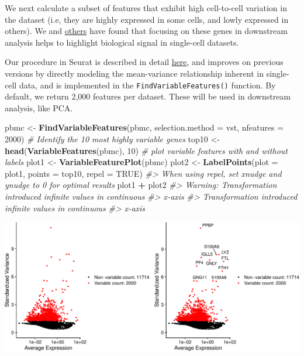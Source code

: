 \documentclass[
]{book}
\newenvironment{Shaded}{\begin{snugshade}}{\end{snugshade}}
\newcommand{\AttributeTok}[1]{\textcolor[rgb]{0.13,0.29,0.53}{#1}}
\newcommand{\CommentTok}[1]{\textcolor[rgb]{0.56,0.35,0.01}{\textit{#1}}}
\newcommand{\ConstantTok}[1]{\textcolor[rgb]{0.56,0.35,0.01}{#1}}
\newcommand{\DecValTok}[1]{\textcolor[rgb]{0.00,0.00,0.81}{#1}}
\newcommand{\FunctionTok}[1]{\textcolor[rgb]{0.13,0.29,0.53}{\textbf{#1}}}
\newcommand{\NormalTok}[1]{#1}
\newcommand{\OtherTok}[1]{\textcolor[rgb]{0.56,0.35,0.01}{#1}}
\newcommand{\SpecialCharTok}[1]{\textcolor[rgb]{0.81,0.36,0.00}{\textbf{#1}}}
\newcommand{\StringTok}[1]{\textcolor[rgb]{0.31,0.60,0.02}{#1}}
\begin{document}
We next calculate a subset of features that exhibit high cell-to-cell variation in the dataset (i.e, they are highly expressed in some cells, and lowly expressed in others). We and \href{https://www.nature.com/articles/nmeth.2645}{others} have found that focusing on these genes in downstream analysis helps to highlight biological signal in single-cell datasets.

Our procedure in Seurat is described in detail \href{https://doi.org/10.1016/j.cell.2019.05.031}{here}, and improves on previous versions by directly modeling the mean-variance relationship inherent in single-cell data, and is implemented in the \texttt{FindVariableFeatures()} function. By default, we return 2,000 features per dataset. These will be used in downstream analysis, like PCA.

\begin{Shaded}
\begin{Highlighting}[]
\NormalTok{pbmc }\OtherTok{\textless{}{-}} \FunctionTok{FindVariableFeatures}\NormalTok{(pbmc, }\AttributeTok{selection.method =} \StringTok{\textquotesingle{}vst\textquotesingle{}}\NormalTok{, }\AttributeTok{nfeatures =} \DecValTok{2000}\NormalTok{)}
\CommentTok{\# Identify the 10 most highly variable genes}
\NormalTok{top10 }\OtherTok{\textless{}{-}} \FunctionTok{head}\NormalTok{(}\FunctionTok{VariableFeatures}\NormalTok{(pbmc), }\DecValTok{10}\NormalTok{)}
\CommentTok{\# plot variable features with and without labels}
\NormalTok{plot1 }\OtherTok{\textless{}{-}} \FunctionTok{VariableFeaturePlot}\NormalTok{(pbmc)}
\NormalTok{plot2 }\OtherTok{\textless{}{-}} \FunctionTok{LabelPoints}\NormalTok{(}\AttributeTok{plot =}\NormalTok{ plot1, }\AttributeTok{points =}\NormalTok{ top10, }\AttributeTok{repel =} \ConstantTok{TRUE}\NormalTok{)}
\CommentTok{\#\textgreater{} When using repel, set xnudge and ynudge to 0 for optimal results}
\NormalTok{plot1 }\SpecialCharTok{+}\NormalTok{ plot2}
\CommentTok{\#\textgreater{} Warning: Transformation introduced infinite values in continuous}
\CommentTok{\#\textgreater{} x{-}axis}
\CommentTok{\#\textgreater{} Transformation introduced infinite values in continuous}
\CommentTok{\#\textgreater{} x{-}axis}
\end{Highlighting}
\end{Shaded}

\includegraphics{scRNAseqInR_Doco_files/figure-latex/var_features-1.pdf}
\end{document}
